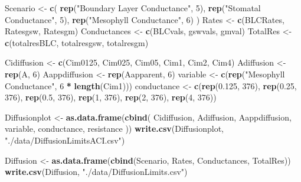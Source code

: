 \documentclass[
]{krantz}
\makeatletter
\newenvironment{Shaded}{\begin{snugshade}}{\end{snugshade}}
\newcommand{\DecValTok}[1]{\textcolor[rgb]{0.00,0.00,0.81}{#1}}
\newcommand{\FloatTok}[1]{\textcolor[rgb]{0.00,0.00,0.81}{#1}}
\newcommand{\KeywordTok}[1]{\textcolor[rgb]{0.13,0.29,0.53}{\textbf{#1}}}
\newcommand{\NormalTok}[1]{#1}
\newcommand{\OperatorTok}[1]{\textcolor[rgb]{0.81,0.36,0.00}{\textbf{#1}}}
\newcommand{\StringTok}[1]{\textcolor[rgb]{0.31,0.60,0.02}{#1}}
\newenvironment{kframe}{%
\medskip{}
\setlength{\fboxsep}{.8em}
 \def\at@end@of@kframe{}%
 \ifinner\ifhmode%
  \def\at@end@of@kframe{\end{minipage}}%
  \begin{minipage}{\columnwidth}%
 \fi\fi%
 \def\FrameCommand##1{\hskip\@totalleftmargin \hskip-\fboxsep
 \colorbox{shadecolor}{##1}\hskip-\fboxsep
     \hskip-\linewidth \hskip-\@totalleftmargin \hskip\columnwidth}%
 \MakeFramed {\advance\hsize-\width
   \@totalleftmargin\z@ \linewidth\hsize
   \@setminipage}}%
 {\par\unskip\endMakeFramed%
 \at@end@of@kframe}
\renewenvironment{Shaded}{\begin{kframe}}{\end{kframe}}
\makeatother
\begin{document}
\begin{Shaded}
\begin{Highlighting}[]
\NormalTok{Scenario <-}
\StringTok{  }\KeywordTok{c}\NormalTok{(}
    \KeywordTok{rep}\NormalTok{(}\StringTok{"Boundary Layer Conductance"}\NormalTok{, }\DecValTok{5}\NormalTok{),}
    \KeywordTok{rep}\NormalTok{(}\StringTok{"Stomatal Conductance"}\NormalTok{, }\DecValTok{5}\NormalTok{),}
    \KeywordTok{rep}\NormalTok{(}\StringTok{"Mesophyll Conductance"}\NormalTok{, }\DecValTok{6}\NormalTok{)}
\NormalTok{  )}
\NormalTok{Rates <-}\StringTok{ }\KeywordTok{c}\NormalTok{(BLCRates, Ratesgsw, Ratesgm)}
\NormalTok{Conductances <-}\StringTok{ }\KeywordTok{c}\NormalTok{(BLCvals, gswvals, gmval)}
\NormalTok{TotalRes <-}\StringTok{ }\KeywordTok{c}\NormalTok{(totalresBLC, totalresgsw, totalresgm)}

\NormalTok{Cidiffusion <-}\StringTok{ }\KeywordTok{c}\NormalTok{(Cim0125, Cim025, Cim05, Cim1, Cim2, Cim4)}
\NormalTok{Adiffusion <-}\StringTok{ }\KeywordTok{rep}\NormalTok{(A, }\DecValTok{6}\NormalTok{)}
\NormalTok{Aappdiffusion <-}\StringTok{ }\KeywordTok{rep}\NormalTok{(Aapparent, }\DecValTok{6}\NormalTok{)}
\NormalTok{variable <-}\StringTok{ }\KeywordTok{c}\NormalTok{(}\KeywordTok{rep}\NormalTok{(}\StringTok{"Mesophyll Conductance"}\NormalTok{, }\DecValTok{6} \OperatorTok{*}\StringTok{ }\KeywordTok{length}\NormalTok{(Cim1)))}
\NormalTok{conductance <-}
\StringTok{  }\KeywordTok{c}\NormalTok{(}\KeywordTok{rep}\NormalTok{(}\FloatTok{0.125}\NormalTok{, }\DecValTok{376}\NormalTok{),}
    \KeywordTok{rep}\NormalTok{(}\FloatTok{0.25}\NormalTok{, }\DecValTok{376}\NormalTok{),}
    \KeywordTok{rep}\NormalTok{(}\FloatTok{0.5}\NormalTok{, }\DecValTok{376}\NormalTok{),}
    \KeywordTok{rep}\NormalTok{(}\DecValTok{1}\NormalTok{, }\DecValTok{376}\NormalTok{),}
    \KeywordTok{rep}\NormalTok{(}\DecValTok{2}\NormalTok{, }\DecValTok{376}\NormalTok{),}
    \KeywordTok{rep}\NormalTok{(}\DecValTok{4}\NormalTok{, }\DecValTok{376}\NormalTok{))}


\NormalTok{Diffusionplot <-}
\StringTok{  }\KeywordTok{as.data.frame}\NormalTok{(}\KeywordTok{cbind}\NormalTok{(}
\NormalTok{    Cidiffusion,}
\NormalTok{    Adiffusion,}
\NormalTok{    Aappdiffusion,}
\NormalTok{    variable,}
\NormalTok{    conductance,}
\NormalTok{    resistance}
\NormalTok{  ))}
\KeywordTok{write.csv}\NormalTok{(Diffusionplot, }\StringTok{"./data/DiffusionLimitsACI.csv"}\NormalTok{)}

\NormalTok{Diffusion <-}
\StringTok{  }\KeywordTok{as.data.frame}\NormalTok{(}\KeywordTok{cbind}\NormalTok{(Scenario, Rates, Conductances, TotalRes))}
\KeywordTok{write.csv}\NormalTok{(Diffusion, }\StringTok{"./data/DiffusionLimits.csv"}\NormalTok{)}
\end{Highlighting}
\end{Shaded}
\end{document}
